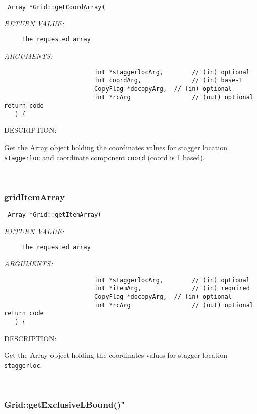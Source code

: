   
\begin{verbatim} Array *Grid::getCoordArray(
 \end{verbatim}{\em RETURN VALUE:}
\begin{verbatim}     The requested array\end{verbatim}{\em ARGUMENTS:}
\begin{verbatim}                         int *staggerlocArg,        // (in) optional
                         int coordArg,              // (in) base-1
                         CopyFlag *docopyArg,  // (in) optional
                         int *rcArg                 // (out) optional return code 
   ) {\end{verbatim}
{\sf DESCRIPTION:\\ }


      Get the Array object holding the coordinates values for stagger location
      {\tt staggerloc} and coordinate component {\tt coord} (coord is 1 based). 
 
\mbox{}\hrulefill\ 
 
\subsubsection [gridItemArray] {gridItemArray}


  
\begin{verbatim} Array *Grid::getItemArray(
 \end{verbatim}{\em RETURN VALUE:}
\begin{verbatim}     The requested array\end{verbatim}{\em ARGUMENTS:}
\begin{verbatim}                         int *staggerlocArg,        // (in) optional
                         int *itemArg,              // (in) required
                         CopyFlag *docopyArg,  // (in) optional
                         int *rcArg                 // (out) optional return code 
   ) {\end{verbatim}
{\sf DESCRIPTION:\\ }


      Get the Array object holding the coordinates values for stagger location
      {\tt staggerloc}. 
 
\mbox{}\hrulefill\
 
\subsubsection [Grid::getExclusiveLBound()"] {Grid::getExclusiveLBound()"}


